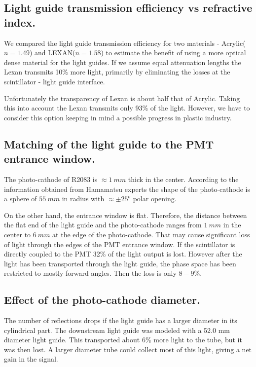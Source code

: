 \subsection{Light guide transmission efficiency vs refractive index.}
\label{mu5}
We compared the light guide transmission efficiency
for two materials - Acrylic($n=1.49$) and LEXAN($n=1.58$) to estimate the benefit of using
a  more optical dense material for the light guides.
If we assume equal attenuation lengths the Lexan transmits 10\% more light, primarily by eliminating the losses at the scintillator - light guide interface. 

Unfortunately the transparency  of Lexan is about half that of  Acrylic.
Taking this into account the Lexan transmits only 93\% of the light. 
However, we have to consider
this option keeping in mind a possible  progress in plastic industry.

\subsection{Matching of the light guide to the PMT entrance window.}
\label{mu6}
The photo-cathode of R2083 is $\approx1~mm$ thick in the center.
According to the information obtained from Hamamatsu experts
the shape of the photo-cathode is  a sphere of $55~mm$ in radius with $\approx \pm 25^o$ polar opening.

On the other hand,   the entrance window is flat.
Therefore, the distance between the flat end of the light guide and the 
photo-cathode ranges from $1~mm$ in the center to $6~mm$ at the edge of the photo-cathode. 
That may cause significant loss of light through the edges of the PMT entrance window.
If the scintillator is directly coupled to the PMT 32\% of the light output is lost. 
However after the light has been transported through the light guide, the phase space has been restricted to mostly forward angles. Then the loss is only $8-9\%$.

\subsection{Effect of  the photo-cathode diameter.}
\label{mu7}
The number of reflections
 drops if   the light guide has  a larger diameter in its cylindrical part.
The downstream light guide was modeled with a 52.0 mm diameter light guide.
This transported about 6\% more light to the tube, but it was then lost. 
A larger diameter tube could collect most of this light, giving a net gain in the signal.

